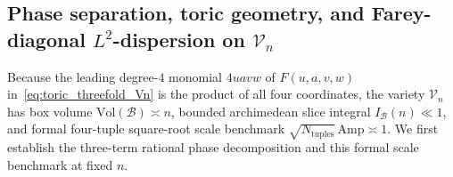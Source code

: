 \documentclass[11pt, a4paper]{article}
\theoremstyle{plain}
\theoremstyle{definition}
\begin{document}
\subsection{Phase separation, toric geometry, and Farey-diagonal $L^{2}$-dispersion on $\mathcal{V}_n$}\label{subsec:parseval_floor}\label{subsec:toric_volume_law}\label{subsec:farey_diagonal_dispersion}

Because the leading degree-$4$ monomial $4uavw$ of $F(u,a,v,w)$ in~\eqref{eq:toric_threefold_Vn} is the product of all four coordinates, the variety $\mathcal{V}_n$ has box volume $\mathrm{Vol}(\mathcal{B})\asymp n$, bounded archimedean slice integral $I_{\mathcal{B}}(n)\ll 1$, and formal four-tuple square-root scale benchmark $\sqrt{N_{\mathrm{tuples}}}\,\mathrm{Amp}\asymp 1$. We first establish the three-term rational phase decomposition and this formal scale benchmark at fixed $n$.
\end{document}
